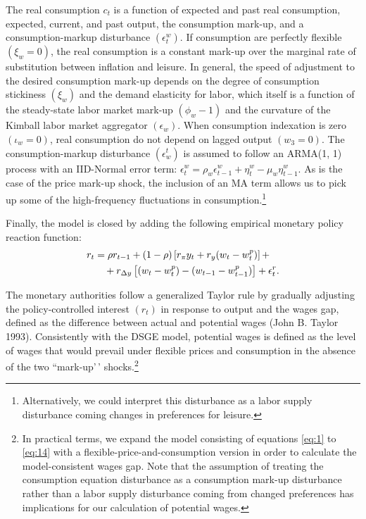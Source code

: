 \documentclass[11pt]{article}
\newcommand{\yobs}[1]{w_{#1}}
\newcommand{\wobs}[1]{c_{#1}}
\newcommand{\robs}[1]{r_{#1}}
\newcommand{\piobs}[1]{y_{#1}}
\newcommand{\youtput}{wages}
\newcommand{\consumption}{inflation}
\newcommand{\labor}{labor}
\newcommand{\interest}{interest}
\newcommand{\wage}{consumption}
\newcommand{\wages}{consumption}
\newcommand{\price}{price}
\newcommand{\prices}{prices}
\newcommand{\inflation}{output}
\newcommand{\leisure}{leisure}
\begin{document}
The real \wage{} \(\wobs{t}\) is a function of expected and past real
\wages, expected, current, and past \inflation, the \wage{} mark-up, and
a \wage-markup disturbance \((\epsilon^w_t)\). If \wages{} are perfectly
flexible \((\xi_w = 0)\), the real \wage{} is a constant mark-up over
the marginal rate of substitution between \consumption{} and \leisure{}.
In general, the speed of adjustment to the desired \wage{} mark-up
depends on the degree of \wage{} stickiness \((\xi_w)\) and the demand
elasticity for \labor, which itself is a function of the steady-state
\labor{} market mark-up \((\phi_w - 1)\) and the curvature of the
Kimball \labor{} market aggregator \((\epsilon_w)\). When \wage{}
indexation is zero \((\iota_w =0)\), real \wages{} do not depend on
lagged \inflation{} \((w_3 = 0)\). The \wage{}-markup disturbance
\((\epsilon_w^t)\) is assumed to follow an ARMA(1, 1) process with an
IID-Normal error term:
\(\epsilon_t^w = \rho_w \epsilon_{t-1}^w + \eta_t^w - \mu_w \eta_{t-1}^w\).
As is the case of the \price{} mark-up shock, the inclusion of an MA
term allows us to pick up some of the high-frequency fluctuations in
\wages{}.\footnote{Alternatively, we
  could interpret this disturbance as a \labor{} supply disturbance
  coming changes in preferences for \leisure{}.}

Finally, the model is closed by adding the following empirical monetary
policy reaction function: \begin{align}
  \label{eq:14}
  \robs{t} &= \rho\robs{t-1} + (1-\rho)\left[r_\pi \piobs{t} +
  r_y(\yobs{t}-\yobs{t}^p)\right]+\\ &\quad + r_{\Delta y}\left[(\yobs{t}-\yobs{t}^{p}) -
  (\yobs{t-1} - \yobs{t-1}^{p})\right] + \epsilon_t^r.\notag
\end{align}

The monetary authorities follow a generalized Taylor rule by gradually
adjusting the policy-controlled \interest{} \((\robs{t})\) in response
to \inflation{} and the \youtput{} gap, defined as the difference
between actual and potential \youtput{} (John B. Taylor 1993).
Consistently with the DSGE model, potential \youtput{} is defined as the
level of \youtput{} that would prevail under flexible \prices{} and
\wages{} in the absence of the two ``mark-up'\,'
shocks.\footnote{In practical
  terms, we expand the model consisting of equations \eqref{eq:1} to
  \eqref{eq:14} with a flexible-\price-and-\wage{} version in order to
  calculate the model-consistent \youtput{} gap. Note that the assumption
  of treating the \wage{} equation disturbance as a \wage{} mark-up
  disturbance rather than a \labor{} supply disturbance coming from
  changed preferences has implications for our calculation of
  potential \youtput{}. }
\end{document}
